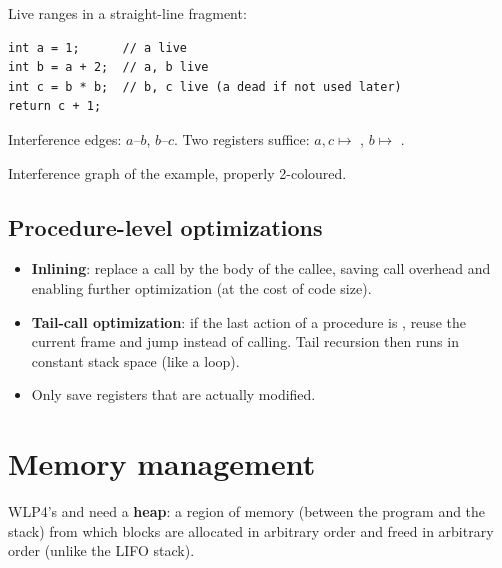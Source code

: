 \begin{example}
Live ranges in a straight-line fragment:
\begin{lstlisting}[style=cpp]
int a = 1;      // a live
int b = a + 2;  // a, b live
int c = b * b;  // b, c live (a dead if not used later)
return c + 1;
\end{lstlisting}
Interference edges: $a$--$b$, $b$--$c$. Two registers suffice: $a, c \mapsto$ ,
$b \mapsto$ .
\end{example}
\begin{center}

\small Interference graph of the example, properly 2-coloured.
\end{center}

\subsection{Procedure-level optimizations}
\begin{itemize}
  \item \textbf{Inlining}: replace a call by the body of the callee, saving call overhead and
        enabling further optimization (at the cost of code size).
  \item \textbf{Tail-call optimization}: if the last action of a procedure is ,
        reuse the current frame and jump instead of calling. Tail recursion then runs in
        constant stack space (like a loop).
  \item Only save registers that are actually modified.
\end{itemize}

\section{Memory management}

WLP4's  and  need a \textbf{heap}: a region of memory (between the
program and the stack) from which blocks are allocated in arbitrary order and freed in
arbitrary order (unlike the LIFO stack).

